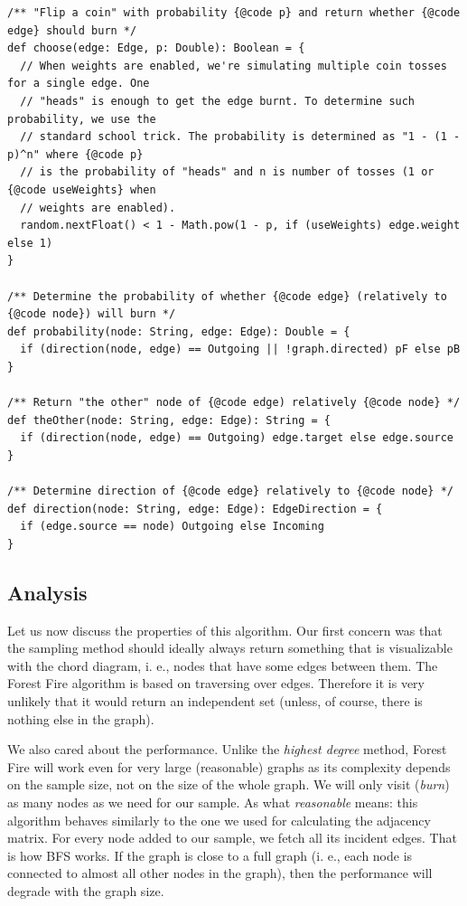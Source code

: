 \begin{verbatim}
/** "Flip a coin" with probability {@code p} and return whether {@code edge} should burn */
def choose(edge: Edge, p: Double): Boolean = {
  // When weights are enabled, we're simulating multiple coin tosses for a single edge. One
  // "heads" is enough to get the edge burnt. To determine such probability, we use the
  // standard school trick. The probability is determined as "1 - (1 - p)^n" where {@code p}
  // is the probability of "heads" and n is number of tosses (1 or {@code useWeights} when
  // weights are enabled).
  random.nextFloat() < 1 - Math.pow(1 - p, if (useWeights) edge.weight else 1)
}

/** Determine the probability of whether {@code edge} (relatively to {@code node}) will burn */
def probability(node: String, edge: Edge): Double = {
  if (direction(node, edge) == Outgoing || !graph.directed) pF else pB
}

/** Return "the other" node of {@code edge) relatively {@code node} */
def theOther(node: String, edge: Edge): String = {
  if (direction(node, edge) == Outgoing) edge.target else edge.source
}

/** Determine direction of {@code edge} relatively to {@code node} */
def direction(node: String, edge: Edge): EdgeDirection = {
  if (edge.source == node) Outgoing else Incoming
}
\end{verbatim}

\subsection{Analysis}

Let us now discuss the properties of this algorithm. Our first concern was that the sampling method should ideally always return something that is visualizable with the chord diagram, i. e., nodes that have some edges between them. The  Forest Fire algorithm is based on traversing over edges. Therefore it is very unlikely that it would return an independent set (unless, of course, there is nothing else in the graph).

We also cared about the performance. Unlike the \emph{highest degree} method, Forest Fire will work even for very large (reasonable) graphs as its complexity depends on the sample size, not on the size of the whole graph. We will only visit (\emph{burn}) as many nodes as we need for our sample. As what \emph{reasonable} means: this algorithm behaves similarly to the one we used for calculating the adjacency matrix. For every node added to our sample, we fetch all its incident edges. That is how BFS works. If the graph is close to a full graph (i. e., each node is connected to almost all other nodes in the graph), then the performance will degrade with the graph size.

